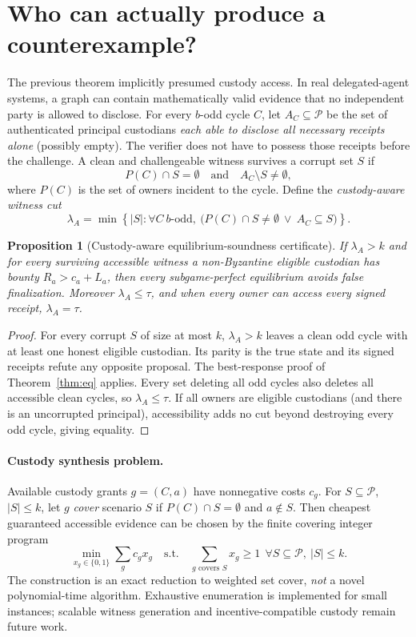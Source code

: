 \documentclass[10pt,a4paper]{article}
\newtheorem{proposition}[theorem]{Proposition}
\newcommand{\Pset}{\mathcal P}
\begin{document}
\section{Who can actually produce a counterexample?}
The previous theorem implicitly presumed custody access. In real delegated-agent systems, a graph can contain mathematically valid evidence that no independent party is allowed to disclose. For every $b$-odd cycle $C$, let $A_C\subseteq\Pset$ be the set of authenticated principal custodians \emph{each able to disclose all necessary receipts alone} (possibly empty). The verifier does not have to possess those receipts before the challenge. A clean and challengeable witness survives a corrupt set $S$ if
\[P(C)\cap S=\emptyset\quad\text{and}\quad A_C\setminus S\ne\emptyset,\]
where $P(C)$ is the set of owners incident to the cycle. Define the \emph{custody-aware witness cut}
\begin{equation}\label{eq:lambda}
 \lambda_A=\min\left\{|S|:\forall C\ b\text{-odd},\ \big(P(C)\cap S\ne\emptyset\ \lor\ A_C\subseteq S\big)\right\}.
\end{equation}

\begin{proposition}[Custody-aware equilibrium-soundness certificate]
If $\lambda_A>k$ and for every surviving accessible witness a non-Byzantine eligible custodian has bounty $R_a>c_a+L_a$, then every subgame-perfect equilibrium avoids false finalization. Moreover $\lambda_A\le\tau$, and when every owner can access every signed receipt, $\lambda_A=\tau$.
\end{proposition}
\begin{proof}
For every corrupt $S$ of size at most $k$, $\lambda_A>k$ leaves a clean odd cycle with at least one honest eligible custodian. Its parity is the true state and its signed receipts refute any opposite proposal. The best-response proof of Theorem~\ref{thm:eq} applies. Every set deleting all odd cycles also deletes all accessible clean cycles, so $\lambda_A\le\tau$. If all owners are eligible custodians (and there is an uncorrupted principal), accessibility adds no cut beyond destroying every odd cycle, giving equality.\end{proof}

\paragraph{Custody synthesis problem.} Available custody grants $g=(C,a)$ have nonnegative costs $c_g$. For $S\subseteq\Pset$, $|S|\le k$, let $g$ \emph{cover} scenario $S$ if $P(C)\cap S=\emptyset$ and $a\notin S$. Then cheapest guaranteed accessible evidence can be chosen by the finite covering integer program
\begin{equation}\label{eq:setcover}
 \min_{x_g\in\{0,1\}}\sum_g c_gx_g\quad\text{s.t.}\quad \sum_{g\text{ covers }S}x_g\ge1\ \ \forall S\subseteq\Pset,\ |S|\le k.
\end{equation}
The construction is an exact reduction to weighted set cover, \emph{not} a novel polynomial-time algorithm. Exhaustive enumeration is implemented for small instances; scalable witness generation and incentive-compatible custody remain future work.
\end{document}
